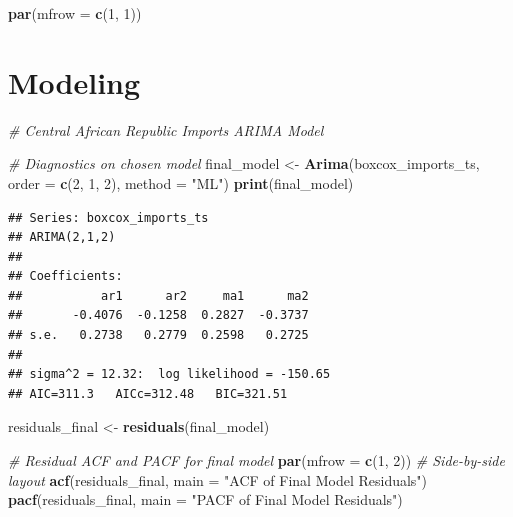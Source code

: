 \documentclass[
]{article}
\newenvironment{Shaded}{\begin{snugshade}}{\end{snugshade}}
\newcommand{\AttributeTok}[1]{\textcolor[rgb]{0.13,0.29,0.53}{#1}}
\newcommand{\CommentTok}[1]{\textcolor[rgb]{0.56,0.35,0.01}{\textit{#1}}}
\newcommand{\DecValTok}[1]{\textcolor[rgb]{0.00,0.00,0.81}{#1}}
\newcommand{\FunctionTok}[1]{\textcolor[rgb]{0.13,0.29,0.53}{\textbf{#1}}}
\newcommand{\NormalTok}[1]{#1}
\newcommand{\OtherTok}[1]{\textcolor[rgb]{0.56,0.35,0.01}{#1}}
\newcommand{\StringTok}[1]{\textcolor[rgb]{0.31,0.60,0.02}{#1}}
\begin{document}
\begin{Shaded}
\begin{Highlighting}[]
\FunctionTok{par}\NormalTok{(}\AttributeTok{mfrow =} \FunctionTok{c}\NormalTok{(}\DecValTok{1}\NormalTok{, }\DecValTok{1}\NormalTok{))}
\end{Highlighting}
\end{Shaded}

\section{Modeling}\label{modeling}

\begin{Shaded}
\begin{Highlighting}[]
\CommentTok{\# Central African Republic Imports ARIMA Model}

\CommentTok{\# Diagnostics on chosen model}
\NormalTok{final\_model }\OtherTok{\textless{}{-}} \FunctionTok{Arima}\NormalTok{(boxcox\_imports\_ts, }\AttributeTok{order =} \FunctionTok{c}\NormalTok{(}\DecValTok{2}\NormalTok{, }\DecValTok{1}\NormalTok{, }\DecValTok{2}\NormalTok{), }\AttributeTok{method =} \StringTok{"ML"}\NormalTok{)}
\FunctionTok{print}\NormalTok{(final\_model)}
\end{Highlighting}
\end{Shaded}

\begin{verbatim}
## Series: boxcox_imports_ts 
## ARIMA(2,1,2) 
## 
## Coefficients:
##           ar1      ar2     ma1      ma2
##       -0.4076  -0.1258  0.2827  -0.3737
## s.e.   0.2738   0.2779  0.2598   0.2725
## 
## sigma^2 = 12.32:  log likelihood = -150.65
## AIC=311.3   AICc=312.48   BIC=321.51
\end{verbatim}

\begin{Shaded}
\begin{Highlighting}[]
\NormalTok{residuals\_final }\OtherTok{\textless{}{-}} \FunctionTok{residuals}\NormalTok{(final\_model)}

\CommentTok{\# Residual ACF and PACF for final model}
\FunctionTok{par}\NormalTok{(}\AttributeTok{mfrow =} \FunctionTok{c}\NormalTok{(}\DecValTok{1}\NormalTok{, }\DecValTok{2}\NormalTok{))  }\CommentTok{\# Side{-}by{-}side layout}
\FunctionTok{acf}\NormalTok{(residuals\_final, }\AttributeTok{main =} \StringTok{"ACF of Final Model Residuals"}\NormalTok{)}
\FunctionTok{pacf}\NormalTok{(residuals\_final, }\AttributeTok{main =} \StringTok{"PACF of Final Model Residuals"}\NormalTok{)}
\end{Highlighting}
\end{Shaded}
\end{document}
